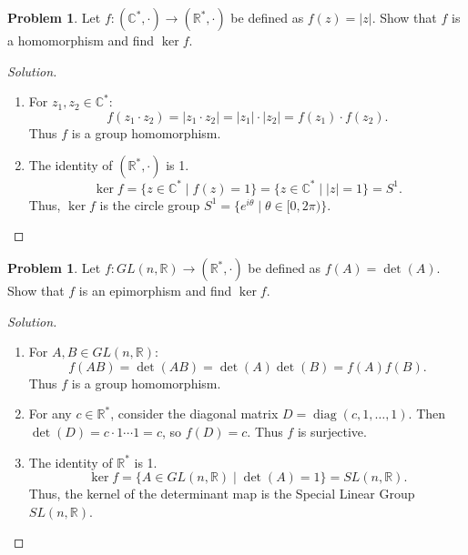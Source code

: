 \documentclass[12pt]{article}
\theoremstyle{definition}
\newtheorem{problem}[definition]{Problem}
\theoremstyle{plain}
\begin{document}
\begin{problem}
Let $f: (\mathbb{C}^*, \cdot) \longrightarrow (\mathbb{R}^*, \cdot)$ be defined as $f(z) = |z|$.
Show that $f$ is a homomorphism and find $\ker f$.
\end{problem}
\begin{proof}[Solution]
\begin{enumerate}
    \item For $z_1, z_2 \in \mathbb{C}^*$:
    \[
    f(z_1 \cdot z_2) = |z_1 \cdot z_2| = |z_1| \cdot |z_2| = f(z_1) \cdot f(z_2).
    \]
    Thus $f$ is a group homomorphism.
    \item The identity of $(\mathbb{R}^*, \cdot)$ is 1.
    \[
    \ker f = \{z \in \mathbb{C}^* \mid f(z) = 1\} = \{z \in \mathbb{C}^* \mid |z| = 1\} = S^1.
    \]
    Thus, $\ker f$ is the circle group $S^1 = \{e^{i\theta} \mid \theta \in [0, 2\pi)\}$.
\end{enumerate}
\end{proof}

\begin{problem}
Let $f: GL(n, \mathbb{R}) \longrightarrow (\mathbb{R}^*, \cdot)$ be defined as $f(A) = \det(A)$.
Show that $f$ is an epimorphism and find $\ker f$.
\end{problem}
\begin{proof}[Solution]
\begin{enumerate}
    \item For $A, B \in GL(n, \mathbb{R})$:
    \[
    f(AB) = \det(AB) = \det(A) \det(B) = f(A) f(B).
    \]
    Thus $f$ is a group homomorphism.
    \item For any $c \in \mathbb{R}^*$, consider the diagonal matrix $D = \operatorname{diag}(c, 1, \dots, 1)$.
    Then $\det(D) = c \cdot 1 \cdots 1 = c$, so $f(D) = c$. Thus $f$ is surjective.
    \item The identity of $\mathbb{R}^*$ is 1.
    \[
    \ker f = \{A \in GL(n, \mathbb{R}) \mid \det(A) = 1\} = SL(n, \mathbb{R}).
    \]
    Thus, the kernel of the determinant map is the Special Linear Group $SL(n, \mathbb{R})$.
\end{enumerate}
\end{proof}

\end{document}
